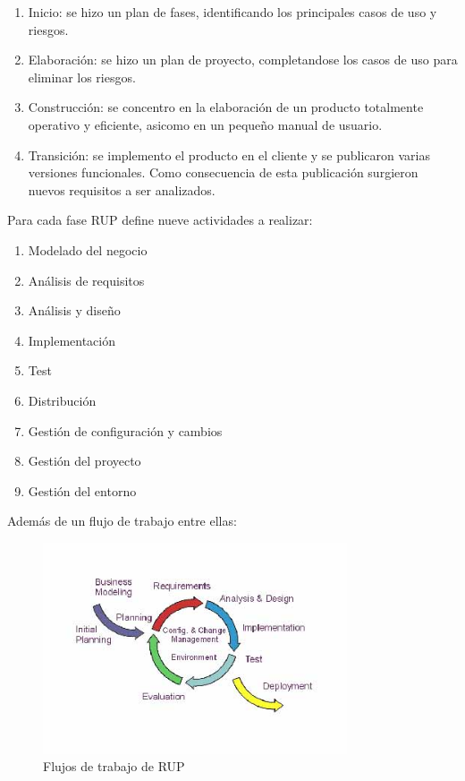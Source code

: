 \begin{enumerate}
  \item Inicio: se hizo un plan de fases, identificando los principales 
	casos de uso y riesgos.
  \item Elaboración: se hizo un plan de proyecto, completandose los casos 
	de uso para eliminar los riesgos.
  \item Construcción: se concentro en la elaboración de un producto totalmente 
	operativo y eficiente, asicomo en un pequeño manual de usuario.
  \item Transición: se implemento el producto en el cliente y se publicaron
	varias versiones funcionales. Como consecuencia de esta publicación
	surgieron nuevos requisitos a ser analizados.
\end{enumerate}

Para cada fase RUP define nueve actividades a realizar:

\begin{enumerate}
 \item Modelado del negocio
 \item Análisis de requisitos
 \item Análisis y diseño
 \item Implementación
 \item Test
 \item Distribución
 \item Gestión de configuración y cambios
 \item Gestión del proyecto
 \item Gestión del entorno
\end{enumerate}

Además de un flujo de trabajo entre ellas:

\begin{figure}[ht]
	\centering
	\includegraphics[width=9cm]{images/workflow-rup.png}
	\caption{Flujos de trabajo de RUP}
	\label{fig:RUP}
\end{figure}

